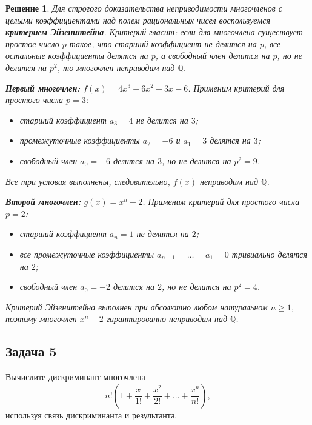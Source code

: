 \documentclass[14pt]{article}
\newtheorem*{solution}{Решение}
\begin{document}
	\begin{solution}
		Для строгого доказательства неприводимости многочленов с целыми коэффициентами над полем рациональных чисел воспользуемся \textbf{критерием Эйзенштейна}. Критерий гласит: если для многочлена существует простое число $p$ такое, что старший коэффициент не делится на $p$, все остальные коэффициенты делятся на $p$, а свободный член делится на $p$, но не делится на $p^2$, то многочлен неприводим над $\mathbb{Q}$.
		
		\textbf{Первый многочлен:} $f(x)=4x^3 - 6x^2 + 3x - 6$. Применим критерий для простого числа $p=3$:
		\begin{itemize}
			\item старший коэффициент $a_3 = 4$ \textit{не делится} на $3$;
			\item промежуточные коэффициенты $a_2 = -6$ и $a_1 = 3$ \textit{делятся} на $3$;
			\item свободный член $a_0 = -6$ \textit{делится} на $3$, но \textit{не делится} на $p^2 = 9$.
		\end{itemize}
		Все три условия выполнены, следовательно, $f(x)$ неприводим над $\mathbb Q$.
		
		\textbf{Второй многочлен:} $g(x)=x^n - 2$. Применим критерий для простого числа $p=2$:
		\begin{itemize}
			\item старший коэффициент $a_n = 1$ \textit{не делится} на $2$;
			\item все промежуточные коэффициенты $a_{n-1} = \dots = a_1 = 0$ тривиально \textit{делятся} на $2$;
			\item свободный член $a_0 = -2$ \textit{делится} на $2$, но \textit{не делится} на $p^2 = 4$.
		\end{itemize}
		Критерий Эйзенштейна выполнен при абсолютно любом натуральном $n\ge 1$, поэтому многочлен $x^n - 2$ гарантированно неприводим над $\mathbb Q$.
	\end{solution}
	
	\subsection*{Задача 5}
	Вычислите дискриминант многочлена
	\[
	n!\left(1 + \frac{x}{1!} + \frac{x^2}{2!} + \dots + \frac{x^n}{n!}\right),
	\]
	используя связь дискриминанта и результанта.
	
\end{document}
